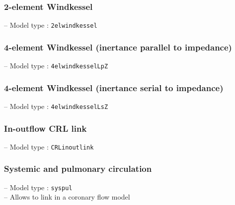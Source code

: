 \documentclass[a4paper,12pt]{report}
\begin{document}
\subsubsection{2-element Windkessel}

-- Model type : \verb"2elwindkessel"\\

\subsubsection{4-element Windkessel (inertance parallel to impedance)}

-- Model type : \verb"4elwindkesselLpZ"\\

\subsubsection{4-element Windkessel (inertance serial to impedance)}

-- Model type : \verb"4elwindkesselLsZ"\\

\subsubsection{In-outflow CRL link}

-- Model type : \verb"CRLinoutlink"\\

\subsubsection{Systemic and pulmonary circulation}

-- Model type : \verb"syspul"\\

-- Allows to link in a coronary flow model
\end{document}
